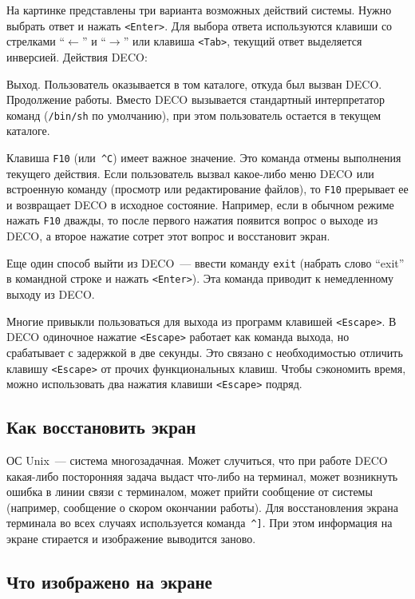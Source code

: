 На картинке представлены три варианта возможных действий системы.
Нужно выбрать ответ и нажать {\tt <Enter>}.
Для выбора ответа используются клавиши со стрелками
``$\leftarrow$'' и ``$\rightarrow$''
или клавиша {\tt <Tab>}, текущий ответ выделяется инверсией.
Действия DECO:

\begin{example}
Выход. Пользователь оказывается в том каталоге, откуда был вызван DECO.
Продолжение работы.
Вместо DECO вызывается стандартный интерпретатор команд ({\tt /bin/sh}
по умолчанию), при этом пользователь остается в текущем каталоге.
\end{example}

Клавиша {\tt F10} (или~{\tt \^{}C})
имеет важное значение. Это команда отмены выполнения текущего действия.
Если пользователь вызвал какое-либо меню DECO
или встроенную команду (просмотр или редактирование файлов), то
{\tt F10} прерывает ее и возвращает DECO в исходное
состояние. Например, если в обычном режиме нажать {\tt F10} дважды,
то после первого нажатия появится вопрос о выходе из DECO, а второе нажатие
сотрет этот вопрос и восстановит экран.

Еще один способ выйти из DECO~--- ввести команду {\tt exit}
(набрать слово ``exit'' в командной строке и нажать {\tt <Enter>}).
Эта команда приводит к немедленному выходу из DECO.

Многие привыкли пользоваться для выхода из
программ клавишей {\tt <Escape>}. В DECO одиночное нажатие {\tt <Escape>}
работает как команда выхода, но срабатывает с задержкой в две секунды.
Это связано с необходимостью отличить клавишу {\tt <Escape>} от прочих
функциональных клавиш. Чтобы сэкономить время, можно использовать
два нажатия клавиши {\tt <Escape>} подряд.

\subsection{Как восстановить экран}

ОС Unix~--- система многозадачная. Может случиться, что при
работе DECO какая-либо посторонняя задача выдаст что-либо на терминал,
может возникнуть ошибка в линии связи с терминалом,
может прийти сообщение от системы (например,
сообщение о скором окончании работы). Для восстановления экрана
терминала во всех случаях используется команда~{\tt \^{}]}.
При этом информация на экране стирается и изображение выводится заново.

\subsection{Что изображено на экране}

